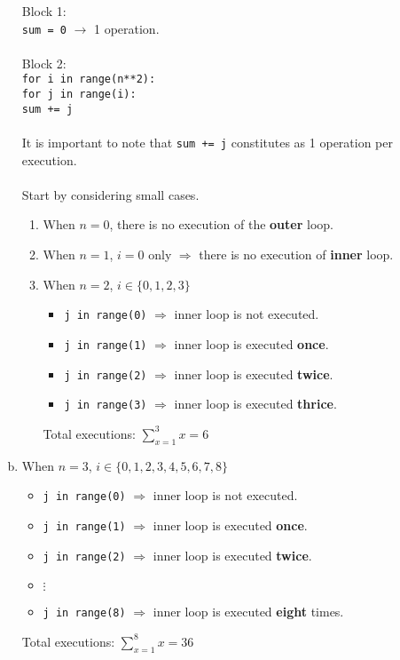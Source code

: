 \documentclass[12pt]{article}
\begin{document}
\begin{enumerate}[(a)]
Block 1:\\
\verb|sum = 0| $\rightarrow$ 1 operation.\\\\Block 2:\\
\verb|for i in range(n**2):|\\\hspace*{0.6cm}\verb|for j in range(i):|\\\hspace*{1.2cm}\verb|sum += j|\\\\It is important to note that \verb|sum += j| constitutes as 1 operation per execution.\\\\Start by considering small cases.
\begin{enumerate}[(1)]
\item When $n=0$, there is no execution of the \textbf{outer} loop.
\item When $n=1$, $i=0$ only $\Rightarrow$ there is no execution of \textbf{inner} loop.
\item When $n=2$, $i\in\{0,1,2,3\}$
\begin{itemize}
\item \verb|j in range(0)| $\Rightarrow$ inner loop is not executed.
\item \verb|j in range(1)| $\Rightarrow$ inner loop is executed \textbf{once}.
\item \verb|j in range(2)| $\Rightarrow$ inner loop is executed \textbf{twice}.
\item \verb|j in range(3)| $\Rightarrow$ inner loop is executed \textbf{thrice}.
\end{itemize}
Total executions: $\sum\limits_{x=1}^{3}x=6$
\end{enumerate}
\item When $n=3$, $i\in\{0,1,2,3,4,5,6,7,8\}$
\begin{itemize}
\item \verb|j in range(0)| $\Rightarrow$ inner loop is not executed.
\item \verb|j in range(1)| $\Rightarrow$ inner loop is executed \textbf{once}.
\item \verb|j in range(2)| $\Rightarrow$ inner loop is executed \textbf{twice}.
\item {$\vdots$}
\item \verb|j in range(8)| $\Rightarrow$ inner loop is executed \textbf{eight} times.
\end{itemize}
Total executions: $\sum\limits_{x=1}^{8}x=36$
\end{enumerate}
\end{document}
